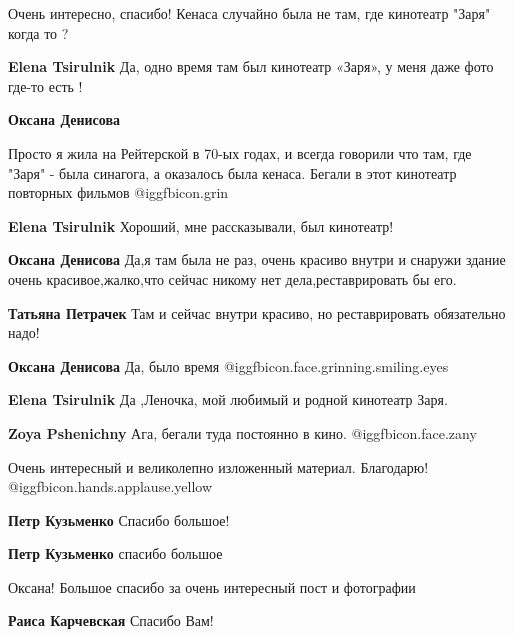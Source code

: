 \begin{itemize}
Очень интересно, спасибо! Кенаса случайно была не там, где кинотеатр "Заря" когда то ?

\begin{itemize} %
\textbf{Elena Tsirulnik} Да, одно время там был кинотеатр «Заря», у меня даже фото где-то есть !

\begin{itemize} %
\textbf{Оксана Денисова} 

Просто я жила на Рейтерской в 70-ых годах, и всегда говорили
что там, где "Заря" - была синагога, а оказалось была
кенаса. Бегали в этот кинотеатр повторных фильмов
@igg{fbicon.grin} 

\textbf{Elena Tsirulnik} Хороший, мне рассказывали, был кинотеатр!

\textbf{Оксана Денисова} Да,я там была не раз, очень красиво внутри и снаружи здание очень красивое,жалко,что сейчас никому нет дела,реставрировать бы его.

\textbf{Татьяна Петрачек} Там и сейчас внутри красиво, но реставрировать обязательно надо!

\textbf{Оксана Денисова} Да, было время @igg{fbicon.face.grinning.smiling.eyes} 
\end{itemize} %

\textbf{Elena Tsirulnik} Да ,Леночка, мой любимый и родной кинотеатр Заря.

\begin{itemize} %
\textbf{Zoya Pshenichny} Ага, бегали туда постоянно в кино. @igg{fbicon.face.zany} 
\end{itemize} %

\end{itemize} %

Очень интересный и великолепно изложенный материал. Благодарю!  @igg{fbicon.hands.applause.yellow} 

\begin{itemize} %
\textbf{Петр Кузьменко} Спасибо большое!

\textbf{Петр Кузьменко} спасибо большое
\end{itemize} %

Оксана!
Большое спасибо за очень интересный пост и фотографии

\begin{itemize} %
\textbf{Раиса Карчевская} Спасибо Вам!
\end{itemize} %


\end{itemize}
